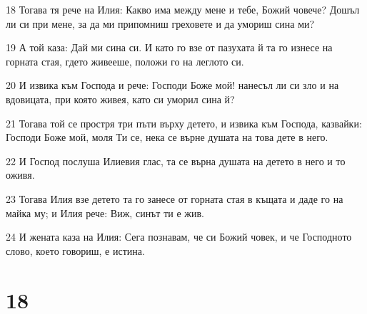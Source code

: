 \par 18 Тогава тя рече на Илия: Какво има между мене и тебе, Божий човече? Дошъл ли си при мене, за да ми припомниш греховете и да умориш сина ми?
\par 19 А той каза: Дай ми сина си. И като го взе от пазухата й та го изнесе на горната стая, гдето живееше, положи го на леглото си.
\par 20 И извика към Господа и рече: Господи Боже мой! нанесъл ли си зло и на вдовицата, при която живея, като си уморил сина й?
\par 21 Тогава той се простря три пъти върху детето, и извика към Господа, казвайки: Господи Боже мой, моля Ти се, нека се върне душата на това дете в него.
\par 22 И Господ послуша Илиевия глас, та се върна душата на детето в него и то оживя.
\par 23 Тогава Илия взе детето та го занесе от горната стая в къщата и даде го на майка му; и Илия рече: Виж, синът ти е жив.
\par 24 И жената каза на Илия: Сега познавам, че си Божий човек, и че Господното слово, което говориш, е истина.

\chapter{18}

